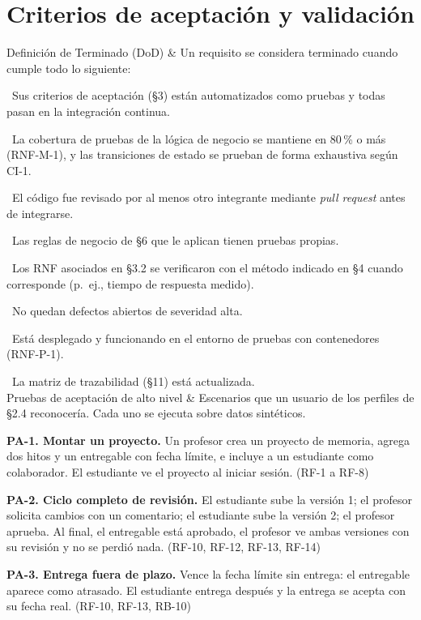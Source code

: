 \documentclass[10pt,a4paper]{article}
\newenvironment{kv}[1][4.6cm]
  {\footnotesize\setlength{\extrarowheight}{3pt}\xltabular{\linewidth}{|E{#1}|L|}\hline}
  {\endxltabular}
\newcommand{\kvrow}[2]{#1 & #2 \\ \hline}
\begin{document}
\section{Criterios de aceptación y validación}
\begin{kv}
\kvrow{Definición de Terminado (DoD)}{Un requisito se considera terminado cuando cumple todo lo siguiente:\par
\textbullet~Sus criterios de aceptación (§3) están automatizados como pruebas y todas pasan en la integración continua.\par
\textbullet~La cobertura de pruebas de la lógica de negocio se mantiene en 80\,\% o más (RNF-M-1), y las transiciones de estado se prueban de forma exhaustiva según CI-1.\par
\textbullet~El código fue revisado por al menos otro integrante mediante \emph{pull request} antes de integrarse.\par
\textbullet~Las reglas de negocio de §6 que le aplican tienen pruebas propias.\par
\textbullet~Los RNF asociados en §3.2 se verificaron con el método indicado en §4 cuando corresponde (p.~ej., tiempo de respuesta medido).\par
\textbullet~No quedan defectos abiertos de severidad alta.\par
\textbullet~Está desplegado y funcionando en el entorno de pruebas con contenedores (RNF-P-1).\par
\textbullet~La matriz de trazabilidad (§11) está actualizada.}
\kvrow{Pruebas de aceptación de alto nivel}{Escenarios que un usuario de los perfiles de §2.4 reconocería. Cada uno se ejecuta sobre datos sintéticos.\par
\textbf{PA-1. Montar un proyecto.} Un profesor crea un proyecto de memoria, agrega dos hitos y un entregable con fecha límite, e incluye a un estudiante como colaborador. El estudiante ve el proyecto al iniciar sesión. (RF-1 a RF-8)\par
\textbf{PA-2. Ciclo completo de revisión.} El estudiante sube la versión 1; el profesor solicita cambios con un comentario; el estudiante sube la versión 2; el profesor aprueba. Al final, el entregable está aprobado, el profesor ve ambas versiones con su revisión y no se perdió nada. (RF-10, RF-12, RF-13, RF-14)\par
\textbf{PA-3. Entrega fuera de plazo.} Vence la fecha límite sin entrega: el entregable aparece como atrasado. El estudiante entrega después y la entrega se acepta con su fecha real. (RF-10, RF-13, RB-10)\par
}
\end{kv}
\end{document}

